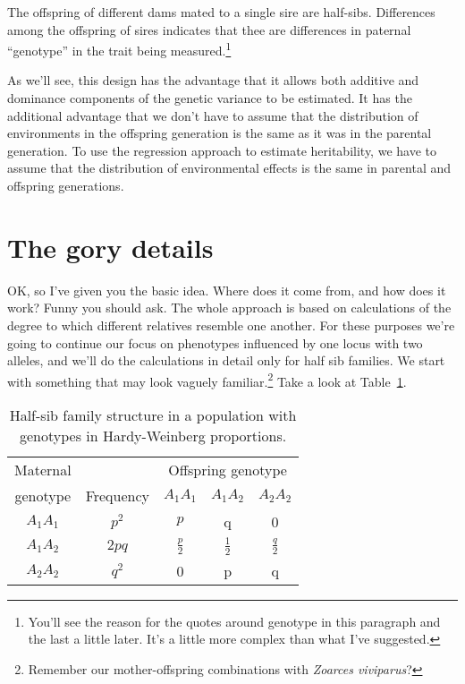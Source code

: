 \documentclass[12pt]{article}
\begin{document}
The offspring of different dams mated to a single sire are
half-sibs. Differences among the offspring of sires indicates that
thee are differences in paternal ``genotype'' in the trait being
measured.\footnote{You'll see the reason for the quotes around
  genotype in this paragraph and the last a little later. It's a
  little more complex than what I've suggested.}

As we'll see, this design has the advantage that it allows both
additive and dominance components of the genetic variance to be
estimated. It has the additional advantage that we don't have to
assume that the distribution of environments in the offspring
generation is the same as it was in the parental generation. To use
the regression approach to estimate heritability, we have to assume
that the distribution of environmental effects is the same in parental
and offspring generations.

\section*{The gory details}

OK, so I've given you the basic idea. Where does it come from, and how
does it work? Funny you should ask. The whole approach is based on
calculations of the degree to which different relatives resemble one
another. For these purposes we're going to continue our focus on
phenotypes influenced by one locus with two alleles, and we'll do the
calculations in detail only for half sib families. We start with
something that may look vaguely familiar.\footnote{Remember our
  mother-offspring combinations with {\it Zoarces viviparus\/}?} Take
a look at Table~\ref{table:half-sib}.

\begin{table}
\begin{center}
\begin{tabular}{c|c|ccc}
\hline\hline
Maternal &           & \multicolumn{3}{c}{Offspring genotype} \\
genotype & Frequency & $A_1A_1$      & $A_1A_2$      & $A_2A_2$ \\
\hline
$A_1A_1$ & $p^2$     & $p$           & q             & 0 \\
$A_1A_2$ & $2pq$     & $\frac{p}{2}$ & $\frac{1}{2}$ & $\frac{q}{2}$ \\
$A_2A_2$ & $q^2$     & 0             & p             & q \\
\hline
\end{tabular}
\end{center}
\caption{Half-sib family structure in a population with genotypes in
  Hardy-Weinberg proportions.}\label{table:half-sib}
\end{table}
\end{document}
